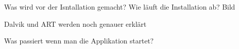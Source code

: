 Was wird vor der Isntallation gemacht?
Wie läuft die Installation ab? Bild

Dalvik und ART werden noch genauer erklärt

Was passiert wenn man die Applikation startet?




%

%




%

%
